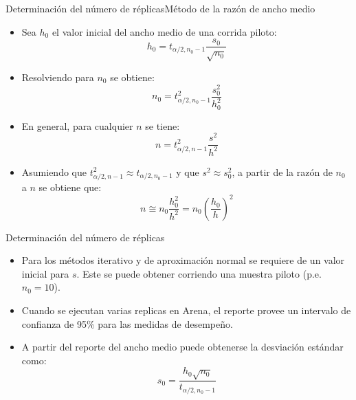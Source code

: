 
\begin{frame}{Determinación del número de réplicas}{Método de la razón de ancho medio}
    \begin{itemize}
        \item Sea $h_0$ el valor inicial del ancho medio de una corrida piloto: 
        \[h_0=t_{\alpha/2,n_0-1}\frac{s_0}{\sqrt{n_0}}\]
        \item Resolviendo para $n_0$ se obtiene:
        \[n_0=t^2_{\alpha/2,n_0-1}\frac{s^2_0}{h^2_0}\]
        \item En general, para cualquier $n$ se tiene:
        \[n=t^2_{\alpha/2,n-1}\frac{s^2}{h^2}\]
        \item Asumiendo que $t^2_{\alpha/2,n-1}\approx t_{\alpha/2,n_0-1}$ y que $s^2 \approx s^2_0$, a partir de la razón de $n_0$ a $n$ se obtiene que:
        \[n\cong n_0\frac{h^2_0}{h^2}=n_0\left(\frac{h_0}{h}\right)^2\]
    \end{itemize}
\end{frame}


\begin{frame}{Determinación del número de réplicas}
    \begin{itemize}
        \item Para los métodos iterativo y de aproximación normal se requiere de un valor inicial para $s$. Este se puede obtener corriendo una muestra piloto (p.e. $n_0=10$).
        \item Cuando se ejecutan varias replicas en Arena, el reporte provee un intervalo de confianza de 95\% para las medidas de desempeño. 
        \item A partir del reporte del ancho medio puede obtenerse la desviación estándar como:%
         \[s_0=\frac{h_0\sqrt{n_0}}{t_{\alpha/2,n_0-1}}\]
    \end{itemize}
\end{frame}

